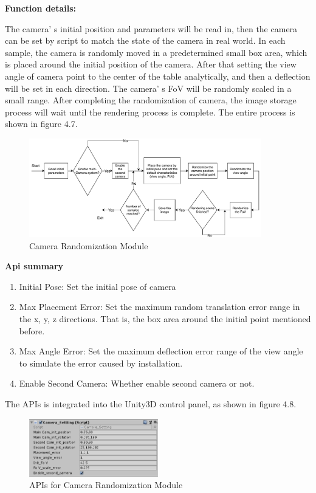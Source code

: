 \textbf{Function details:}

The camera' s initial position and parameters will be read in, then the camera can be set by script to match the state of the camera in real world. In each sample, the camera is randomly moved in a predetermined small box area, which is placed around the initial position of the camera. After that setting the view angle of camera point to the center of the table analytically, and then a deflection will be set in each direction. The camera' s FoV will be randomly scaled in a small range. After completing the randomization of camera, the image storage process will wait until the rendering process is complete. The entire process is shown in figure 4.7.
\begin{figure}[h]
	\includegraphics[width=0.9\textwidth]{Figures/Section4_Camera_randomization.pdf} 
	\centering
	\captionsetup{justification=centering}
	\caption{Camera Randomization Module}
	\label{fig:camrand}
\end{figure}

\textbf{Api summary}
\begin{enumerate}
	\item Initial Pose: Set the initial pose of camera
	\item Max Placement Error: Set the maximum random translation error range in the x, y, z directions. That is, the box area around the initial point mentioned before.
	\item Max Angle Error: Set the maximum deflection error range of the view angle to simulate the error caused by installation.
	\item Enable Second Camera: Whether enable second camera or not.
\end{enumerate}
The APIs is integrated into the Unity3D control panel, as shown in figure 4.8.
\begin{figure}[h]
	\includegraphics[width=0.5\textwidth]{Figures/Section4_CamerardApi.png} 
	\centering
	\captionsetup{justification=centering}
	\caption{APIs for Camera Randomization Module}
	\label{fig:camrandApi}
\end{figure}


